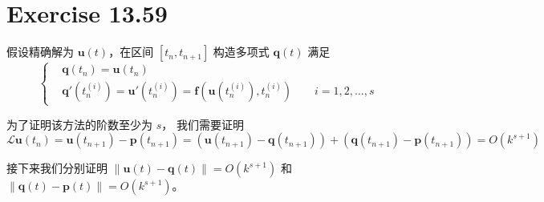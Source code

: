 \documentclass[a4paper]{article}
\begin{document}
\section*{Exercise 13.59}

\par 假设精确解为 $\mathbf{u}(t)$，在区间
$[t_n, t_{n+1}]$ 构造多项式 $\mathbf{q}(t)$ 满足
\begin{equation}
    \left\{
        \begin{aligned}
            &\mathbf{q}(t_n) = \mathbf{u}(t_n)\\
            &\mathbf{q}'(t_n^{(i)}) = \mathbf{u}'(t_n^{(i)})
            =\mathbf{f}\left(
                \mathbf{u}(t_n^{(i)}),t_n^{(i)}
            \right)
            \qquad i = 1,2,\ldots,s
        \end{aligned}
    \right.
\end{equation}
\par 为了证明该方法的阶数至少为 $s$，
我们需要证明
\begin{equation}
    \mathcal{L}\mathbf{u}(t_n) 
    = \mathbf{u}(t_{n+1}) - \mathbf{p}(t_{n+1}) = \left(\mathbf{u}(t_{n+1}) - \mathbf{q}(t_{n+1})\right)
    +\left(\mathbf{q}(t_{n+1}) - \mathbf{p}(t_{n+1})\right)
    = O(k^{s+1})
\end{equation}
\par 接下来我们分别证明 $\left\|\mathbf{u}(t) - \mathbf{q}(t)\right\| = O(k^{s+1})$ 和
$\left\|\mathbf{q}(t) - \mathbf{p}(t)\right\| = O(k^{s+1})$。
\end{document}
